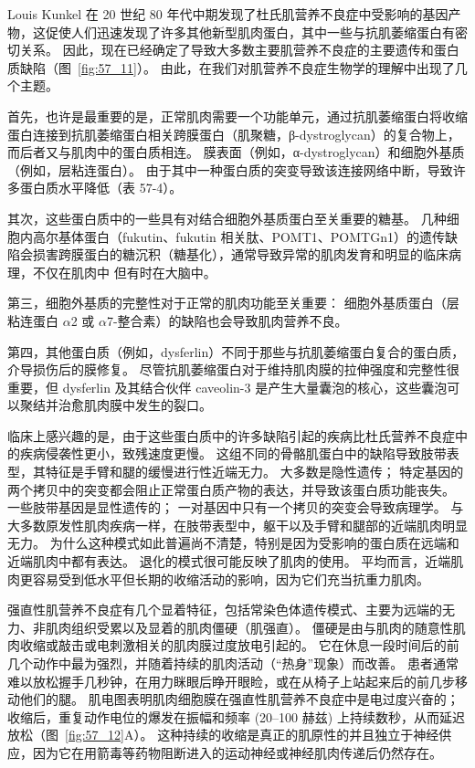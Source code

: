 Louis Kunkel 在 20 世纪 80 年代中期发现了杜氏肌营养不良症中受影响的基因产物，这促使人们迅速发现了许多其他新型肌肉蛋白，其中一些与抗肌萎缩蛋白有密切关系。
因此，现在已经确定了导致大多数主要肌营养不良症的主要遗传和蛋白质缺陷（图~\ref{fig:57_11}）。
由此，在我们对肌营养不良症生物学的理解中出现了几个主题。


首先，也许是最重要的是，正常肌肉需要一个功能单元，通过抗肌萎缩蛋白将收缩蛋白连接到抗肌萎缩蛋白相关跨膜蛋白（肌聚糖，β-dystroglycan）的复合物上，而后者又与肌肉中的蛋白质相连。
膜表面（例如，α-dystroglycan）和细胞外基质（例如，层粘连蛋白）。
由于其中一种蛋白质的突变导致该连接网络中断，导致许多蛋白质水平降低（表 57-4）。


其次，这些蛋白质中的一些具有对结合细胞外基质蛋白至关重要的糖基。
几种细胞内高尔基体蛋白（fukutin、fukutin 相关肽、POMT1、POMTGn1）的遗传缺陷会损害跨膜蛋白的糖沉积（糖基化），通常导致异常的肌肉发育和明显的临床病理，不仅在肌肉中 但有时在大脑中。


第三，细胞外基质的完整性对于正常的肌肉功能至关重要：
细胞外基质蛋白（层粘连蛋白 $\alpha$2 或 $\alpha$7-整合素）的缺陷也会导致肌肉营养不良。


第四，其他蛋白质（例如，dysferlin）不同于那些与抗肌萎缩蛋白复合的蛋白质，介导损伤后的膜修复。
尽管抗肌萎缩蛋白对于维持肌肉膜的拉伸强度和完整性很重要，但 dysferlin 及其结合伙伴 caveolin-3 是产生大量囊泡的核心，这些囊泡可以聚结并治愈肌肉膜中发生的裂口。


临床上感兴趣的是，由于这些蛋白质中的许多缺陷引起的疾病比杜氏营养不良症中的疾病侵袭性更小，致残速度更慢。
这组不同的骨骼肌蛋白中的缺陷导致肢带表型，其特征是手臂和腿的缓慢进行性近端无力。
大多数是隐性遗传； 特定基因的两个拷贝中的突变都会阻止正常蛋白质产物的表达，并导致该蛋白质功能丧失。
一些肢带基因是显性遗传的；
一对基因中只有一个拷贝的突变会导致病理学。
与大多数原发性肌肉疾病一样，在肢带表型中，躯干以及手臂和腿部的近端肌肉明显无力。
为什么这种模式如此普遍尚不清楚，特别是因为受影响的蛋白质在远端和近端肌肉中都有表达。
退化的模式很可能反映了肌肉的使用。
平均而言，近端肌肉更容易受到低水平但长期的收缩活动的影响，因为它们充当抗重力肌肉。


强直性肌营养不良症有几个显着特征，包括常染色体遗传模式、主要为远端的无力、非肌肉组织受累以及显着的肌肉僵硬（肌强直）。
僵硬是由与肌肉的随意性肌肉收缩或敲击或电刺激相关的肌肉膜过度放电引起的。
它在休息一段时间后的前几个动作中最为强烈，并随着持续的肌肉活动（“热身”现象）而改善。
患者通常难以放松握手几秒钟，在用力眯眼后睁开眼睑，或在从椅子上站起来后的前几步移动他们的腿。
肌电图表明肌肉细胞膜在强直性肌营养不良症中是电过度兴奋的；
收缩后，重复动作电位的爆发在振幅和频率 (20–100 赫兹) 上持续数秒，从而延迟放松（图~\ref{fig:57_12}A）。
这种持续的收缩是真正的肌原性的并且独立于神经供应，因为它在用箭毒等药物阻断进入的运动神经或神经肌肉传递后仍然存在。


